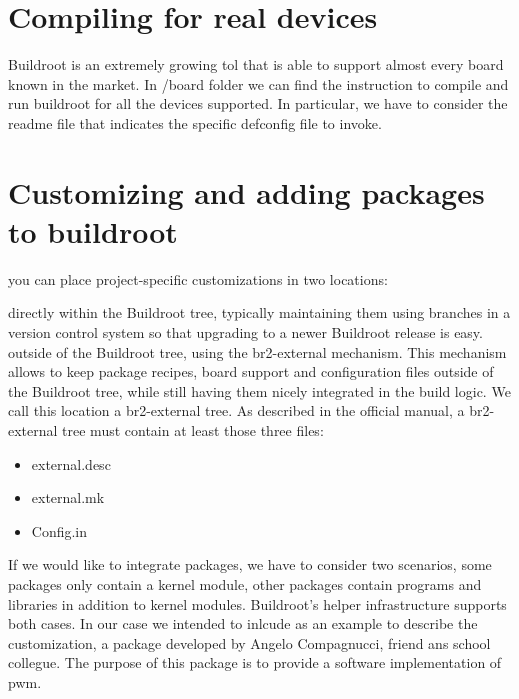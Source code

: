 \documentclass[a4paper,twoside,11pt]{article}
\begin{document}
\section{Compiling for real devices}
Buildroot is an extremely growing tol that is able to support almost every board known in the market.
In /board folder we can find the instruction to compile and run buildroot for all the devices supported.
In particular, we have to consider the readme file that indicates the specific defconfig file to invoke.

\section{Customizing and adding packages to buildroot}
you can place project-specific customizations in two locations:

directly within the Buildroot tree, typically maintaining them using branches in a version control system so that upgrading to a newer Buildroot release is easy.
outside of the Buildroot tree, using the br2-external mechanism. 
This mechanism allows to keep package recipes, board support and configuration files outside of the Buildroot tree, while still having them nicely integrated in the build logic. 
We call this location a br2-external tree. 
As described in the official manual, a br2-external tree must contain at least those three files:

\begin{itemize}
\item external.desc
\item external.mk
\item Config.in
\end{itemize}
If we would like to integrate packages,
we have to consider two scenarios, some packages only contain a kernel module, other packages contain programs and libraries in addition to kernel modules. 
Buildroot's helper infrastructure supports both cases.
In our case we intended to inlcude as an example to describe the customization, a package developed by Angelo Compagnucci, friend ans school collegue.
The purpose of this package is to provide a software implementation of pwm.
\end{document}
